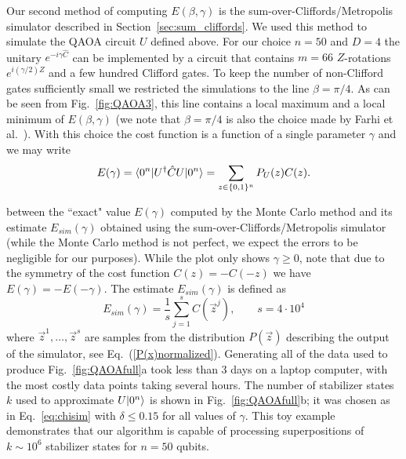 Our second method of computing $E(\beta,\gamma)$
is the sum-over-Cliffords/Metropolis simulator
described in Section~\ref{sec:sum_cliffords}. We used this method to simulate
the QAOA circuit $U$ defined above.  For our choice $n=50$ and $D=4$ 
the unitary  $e^{-i\gamma \hat{C}}$ can be implemented by
a circuit that contains $m=66$ $Z$-rotations $e^{i(\gamma/2)Z}$ 
 and a few hundred Clifford gates. To keep the number of non-Clifford gates sufficiently small we restricted the simulations to the line $\beta=\pi/4$.
As can be seen from Fig.~\ref{fig:QAOA3}, this line contains
a local maximum and a local minimum of $E(\beta,\gamma)$ (we note that $\beta=\pi/4$ is also the choice made by Farhi et al.~\cite{farhi2014quantum}). With this choice the cost function is a function of a single parameter $\gamma$ and we may write
\[
E(\gamma)=\langle 0^n|U^\dag \hat{C} U|0^n\rangle=\sum_{{z} \in \{0,1\}^n} P_U({z}) C({z}).
\]

between the ``exact" value $E(\gamma)$  computed by the Monte Carlo method and
its estimate  $E_{sim}(\gamma)$ obtained using the sum-over-Cliffords/Metropolis  simulator (while the Monte Carlo method is not perfect, we expect the errors to be negligible for our purposes). While the plot only shows $\gamma\geq 0$, note that due to the symmetry of the cost function $C(z)=-C(-z)$ we have $E(\gamma)=-E(-\gamma)$. 
The estimate $E_{sim}(\gamma)$ is defined as  
\[
E_{sim}(\gamma)=\frac1s \sum_{j=1}^s C(\vec{z}^j), \qquad s=4\cdot 10^4
\]
where  $\vec{z}^1,\ldots,\vec{z}^s$ are samples from the distribution $P(\vec{z})$
describing the output of the simulator, see Eq.~(\ref{P(x)normalized}).
Generating all of the data used to produce Fig.~\ref{fig:QAOAfull}a took less than 3 days on a laptop computer, with the most costly data points taking several hours. The number of stabilizer states $k$ used to approximate $U|0^n\rangle$ is shown in Fig.~\ref{fig:QAOAfull}b; it was chosen as in Eq.~\eqref{eq:chisim} with $\delta\leq 0.15$ for all values of $\gamma$. This toy example demonstrates that our algorithm is capable of processing superpositions of $k\sim 10^6$ stabilizer states for $n=50$ qubits.


